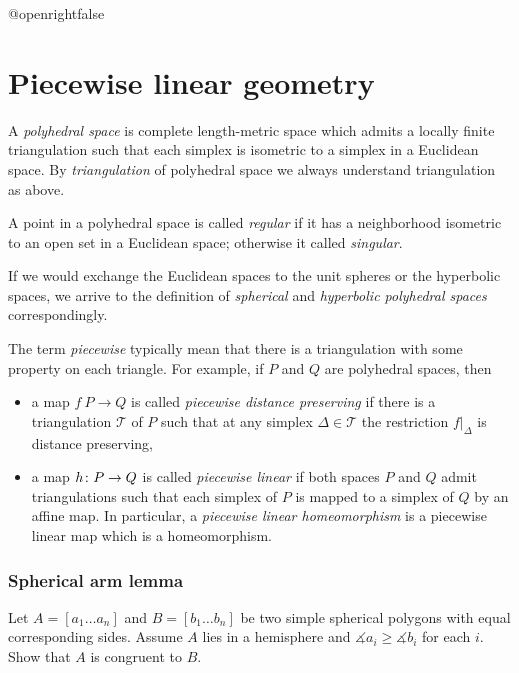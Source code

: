 \csname @openrightfalse\endcsname
\chapter{Piecewise linear geometry}


A \emph{polyhedral space} is complete length-metric space which admits a locally finite triangulation 
such that each simplex is isometric to a simplex in a Euclidean space.
By {}\emph{triangulation} of polyhedral space we always understand triangulation as above. 

A point in a polyhedral space is called \emph{regular} if it has a neighborhood isometric to an open set in a Euclidean space;
otherwise it called {}\emph{singular}.

If we would exchange the Euclidean spaces to the unit spheres or the hyperbolic spaces,
we arrive to the definition of {}\emph{spherical} and {}\emph{hyperbolic polyhedral spaces} correspondingly.

The term \emph{piecewise} typically mean that there is a triangulation with some property on each triangle.
For example,  if $P$ and $Q$ are polyhedral spaces, then
\begin{itemize}
\item a map $f\:P\to Q$ is called {}\emph{piecewise distance preserving} if there is a triangulation $\mathcal{T}$ of $P$ such that at any simplex $\Delta\in \mathcal{T}$ the restriction $f|_\Delta$ is distance preserving,
\item a map $h\:P\z\to Q$  is called {}\emph{piecewise linear} if both spaces $P$ and $Q$ admit triangulations such that each simplex of $P$ is mapped to a simplex of $Q$ by an affine map.
In particular, a {}\emph{piecewise linear homeomorphism} is a piecewise linear map which is a homeomorphism.\label{piecewise linear map}
\end{itemize}





\subsection*{Spherical arm lemma}\label{Spherical arm lemma}

\begin{pr}
Let $A=[a_1\dots a_n]$ and $B=[b_1\dots b_n]$ be two simple spherical polygons 
with equal corresponding sides.
Assume $A$ lies in a hemisphere and $\measuredangle a_i\ge\measuredangle b_i$ for each $i$.
Show that $A$ is congruent to $B$.
\end{pr}

